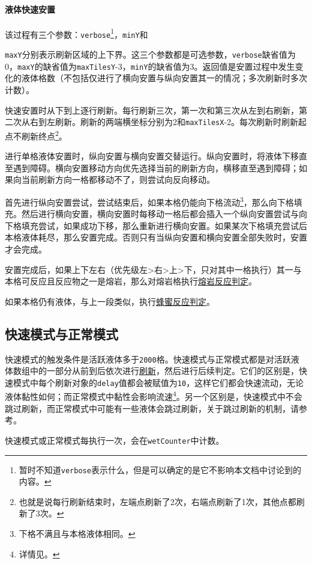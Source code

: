 \paragraph*{液体快速安置}\label{app30}
该过程有三个参数：\lstinline{verbose}\footnote{暂时不知道\lstinline{verbose}表示什么，但是可以确定的是它不影响本文档中讨论到的内容。}，\lstinline{minY}和{\lstinline{maxY}分别表示刷新区域的上下界。这三个参数都是可选参数，\lstinline{verbose}缺省值为0，\lstinline{maxY}的缺省值为\lstinline{maxTilesY}-3，\lstinline{minY}的缺省值为3。返回值是安置过程中发生变化的液体格数（不包括仅进行了横向安置与纵向安置其一的情况；多次刷新时多次计数）。

快速安置时从下到上逐行刷新。每行刷新三次，第一次和第三次从左到右刷新，第二次从右到左刷新。刷新的两端横坐标分别为2和\lstinline{maxTilesX}-2。每次刷新时刷新起点不刷新终点\footnote{也就是说每行刷新结束时，左端点刷新了2次，右端点刷新了1次，其他点都刷新了3次。}。

进行单格液体安置时，纵向安置与横向安置交替运行。纵向安置时，将液体下移直至遇到障碍。横向安置移动方向优先选择当前的刷新方向，横移直至遇到障碍；如果向当前刷新方向一格都移动不了，则尝试向反向移动。

首先进行纵向安置尝试，尝试结束后，如果本格仍能向下格流动\footnote{下格不满且与本格液体相同。}，那么向下格填充。然后进行横向安置，横向安置时每移动一格后都会插入一个纵向安置尝试与向下格填充尝试，如果成功下移，那么重新进行横向安置。如果某次下格填充尝试后本格液体耗尽，那么安置完成。否则只有当纵向安置和横向安置全部失败时，安置才会完成。

安置完成后，如果上下左右（优先级左>右>上>下，只对其中一格执行）其一与本格可反应且反应物之一是熔岩，那么对熔岩格执行\hyperref[app24]{熔岩反应判定}。

如果本格仍有液体，与上一段类似，执行\hyperref[app25]{蜂蜜反应判定}。

\subsection{快速模式与正常模式}\label{app27}
快速模式的触发条件是活跃液体多于\lstinline{2000}格。快速模式与正常模式都是对活跃液体数组中的一部分从前到后依次进行\hyperref[app26]{刷新}，然后进行后续判定。它们的区别是，快速模式中每个刷新对象的\lstinline{delay}值都会被赋值为\lstinline{10}，这样它们都会快速流动，无论液体黏性如何；而正常模式中黏性会影响流速\footnote{详情见。}。另一个区别是，快速模式中不会跳过刷新，而正常模式中可能有一些液体会跳过刷新，关于跳过刷新的机制，请参考。

快速模式或正常模式每执行一次，会在\lstinline{wetCounter}中计数。

}
